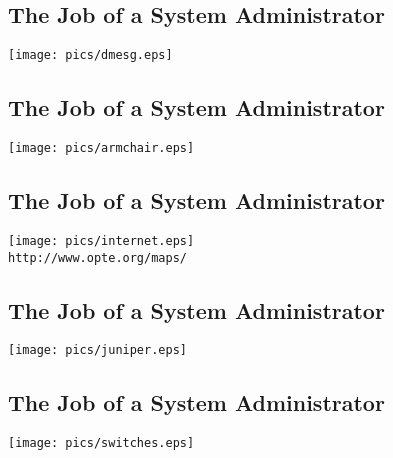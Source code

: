 \documentclass[xga]{xdvislides}
\begin{document}
\subsection{The Job of a System Administrator}
\vspace*{\fill}
\begin{center}
	\texttt{[image: pics/dmesg.eps]} \\
\end{center}
\vspace*{\fill}

\subsection{The Job of a System Administrator}
\vspace*{\fill}
\begin{center}
	\texttt{[image: pics/armchair.eps]} \\
\end{center}
\vspace*{\fill}

\subsection{The Job of a System Administrator}
\vspace*{\fill}
\begin{center}
	\texttt{[image: pics/internet.eps]} \\
	\small
	{\tt http://www.opte.org/maps/}
	\Normalsize
\end{center}
\vspace*{\fill}

\subsection{The Job of a System Administrator}
\vspace*{\fill}
\begin{center}
	\texttt{[image: pics/juniper.eps]} \\
\end{center}
\vspace*{\fill}

\subsection{The Job of a System Administrator}
\vspace*{\fill}
\begin{center}
	\texttt{[image: pics/switches.eps]} \\
\end{center}
\vspace*{\fill}
\end{document}
